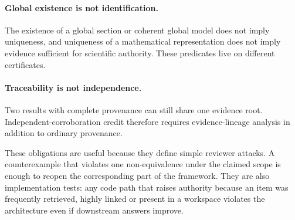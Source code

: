 \paragraph{Global existence is not identification.}
The existence of a global section or coherent global model does not imply uniqueness, and uniqueness of a mathematical representation does not imply evidence sufficient for scientific authority. These predicates live on different certificates.

\paragraph{Traceability is not independence.}
Two results with complete provenance can still share one evidence root. Independent-corroboration credit therefore requires evidence-lineage analysis in addition to ordinary provenance.

These obligations are useful because they define simple reviewer attacks. A counterexample that violates one non-equivalence under the claimed scope is enough to reopen the corresponding part of the framework. They are also implementation tests: any code path that raises authority because an item was frequently retrieved, highly linked or present in a workspace violates the architecture even if downstream answers improve.
